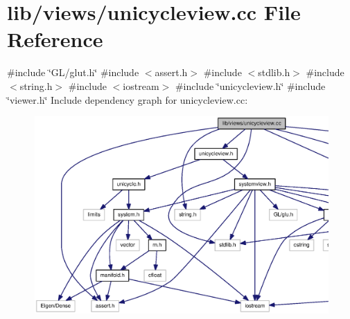 \section{lib/views/unicycleview.cc \-File \-Reference}
\label{unicycleview_8cc}
{\ttfamily \#include \char`\"{}\-G\-L/glut.\-h\char`\"{}}\*
{\ttfamily \#include $<$assert.\-h$>$}\*
{\ttfamily \#include $<$stdlib.\-h$>$}\*
{\ttfamily \#include $<$string.\-h$>$}\*
{\ttfamily \#include $<$iostream$>$}\*
{\ttfamily \#include \char`\"{}unicycleview.\-h\char`\"{}}\*
{\ttfamily \#include \char`\"{}viewer.\-h\char`\"{}}\*
\-Include dependency graph for unicycleview.\-cc\-:\nopagebreak
\begin{figure}[H]
\begin{center}
\leavevmode
\includegraphics[width=350pt]{unicycleview_8cc__incl}
\end{center}
\end{figure}
